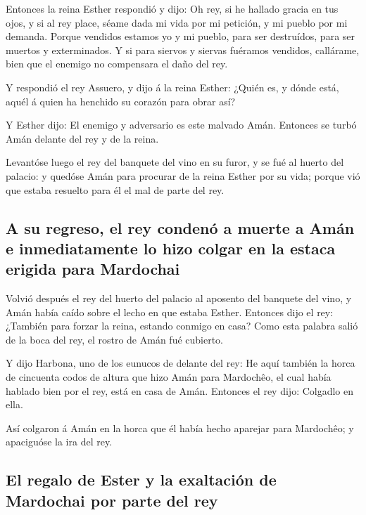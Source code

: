  Entonces la reina Esther respondió y dijo: Oh rey, si he
hallado gracia en tus ojos, y si al rey place, séame dada mi vida por mi
petición, y mi pueblo por mi demanda.  Porque vendidos
estamos yo y mi pueblo, para ser destruídos, para ser muertos y
exterminados. Y si para siervos y siervas fuéramos vendidos, callárame,
bien que el enemigo no compensara el daño del rey.

 Y respondió el rey Assuero, y dijo á la reina Esther:
¿Quién es, y dónde está, aquél á quien ha henchido su corazón para obrar
así?

 Y Esther dijo: El enemigo y adversario es este malvado
Amán. Entonces se turbó Amán delante del rey y de la reina.

 Levantóse luego el rey del banquete del vino en su furor, y
se fué al huerto del palacio: y quedóse Amán para procurar de la reina
Esther por su vida; porque vió que estaba resuelto para él el mal de
parte del rey.

\hypertarget{a-su-regreso-el-rey-condenuxf3-a-muerte-a-amuxe1n-e-inmediatamente-lo-hizo-colgar-en-la-estaca-erigida-para-mardochai}{%
\subsection{A su regreso, el rey condenó a muerte a Amán e
inmediatamente lo hizo colgar en la estaca erigida para
Mardochai}\label{a-su-regreso-el-rey-condenuxf3-a-muerte-a-amuxe1n-e-inmediatamente-lo-hizo-colgar-en-la-estaca-erigida-para-mardochai}}

 Volvió después el rey del huerto del palacio al aposento
del banquete del vino, y Amán había caído sobre el lecho en que estaba
Esther. Entonces dijo el rey: ¿También para forzar la reina, estando
conmigo en casa? Como esta palabra salió de la boca del rey, el rostro
de Amán fué cubierto.

 Y dijo Harbona, uno de los eunucos de delante del rey: He
aquí también la horca de cincuenta codos de altura que hizo Amán para
Mardochêo, el cual había hablado bien por el rey, está en casa de Amán.
Entonces el rey dijo: Colgadlo en ella.

 Así colgaron á Amán en la horca que él había hecho
aparejar para Mardochêo; y apaciguóse la ira del rey.

\hypertarget{el-regalo-de-ester-y-la-exaltaciuxf3n-de-mardochai-por-parte-del-rey}{%
\subsection{El regalo de Ester y la exaltación de Mardochai por parte
del
rey}\label{el-regalo-de-ester-y-la-exaltaciuxf3n-de-mardochai-por-parte-del-rey}}


